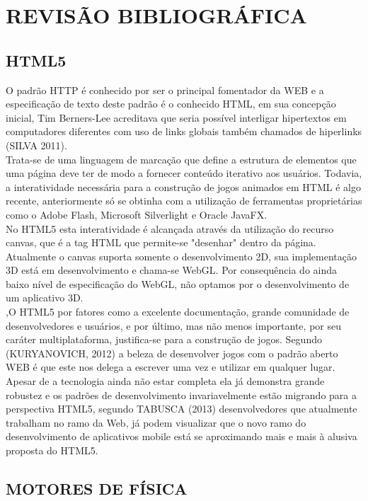 \documentclass{article}
\begin{document}
\section{REVISÃO BIBLIOGRÁFICA}
\subsection{HTML5}
O padrão HTTP é conhecido por ser o principal fomentador da WEB e a especificação de texto deste padrão é o conhecido HTML, em sua concepção inicial, Tim Berners-Lee acreditava que seria possível  interligar hipertextos em computadores diferentes com uso de links globais também chamados de hiperlinks (SILVA 2011).
\\
Trata-se de uma linguagem de marcação que define a estrutura de elementos que uma página deve ter de modo a fornecer conteúdo iterativo aos usuários. Todavia, a interatividade necessária para a construção de jogos animados em HTML é algo recente, anteriormente só se obtinha com a utilização de ferramentas proprietárias como o Adobe Flash, Microsoft Silverlight e Oracle JavaFX. 
\\
No HTML5 esta interatividade é alcançada através da utilização do recurso canvas, que é a tag HTML que permite-se "desenhar" dentro da página.
\\
Atualmente o canvas suporta somente o desenvolvimento 2D, sua implementação 3D está em desenvolvimento e chama-se WebGL. Por consequência do ainda baixo nível de especificação do WebGL, não optamos por o desenvolvimento de um aplicativo 3D.
\\
,O HTML5 por fatores como a excelente documentação, grande comunidade de desenvolvedores e usuários, e por último, mas não menos importante, por seu caráter multiplataforma, justifica-se para a construção de jogos. Segundo (KURYANOVICH, 2012) a beleza de desenvolver jogos com o padrão aberto WEB é que este nos delega a escrever uma vez e utilizar em qualquer lugar.
\\
Apesar de a tecnologia  ainda não estar completa ela já demonstra grande robustez  e os padrões de desenvolvimento invariavelmente estão migrando para a perspectiva HTML5, segundo TABUSCA (2013) desenvolvedores que atualmente trabalham no ramo da Web, já podem visualizar que o novo ramo do desenvolvimento de aplicativos mobile está se aproximando mais e mais à alusiva proposta do HTML5. 

\subsection{MOTORES DE FÍSICA}
\\
\end{document}
